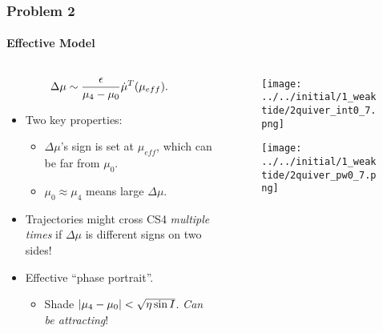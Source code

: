 \documentclass[dvipsnames, 11pt]{beamer}
\DeclarePairedDelimiter\abs{\lvert}{\rvert}
\DeclarePairedDelimiter\p{\lparen}{\rparen}
\begin{document}
\begin{frame}
    \frametitle{Problem 2}
    \framesubtitle{Effective Model}

    \begin{columns}
        \begin{column}{0.5\textwidth}
            \begin{equation*}
                \Delta \mu \sim \frac{\epsilon}{\mu_4 - \mu_0}
                        \dot{\mu}^{T}\p*{\mu_{eff}}.
            \end{equation*}
            \begin{itemize}
                \item Two key properties:
                    \begin{itemize}
                        \item $\Delta \mu$'s sign is set at $\mu_{eff}$, which
                            can be far from $\mu_0$.

                        \item $\mu_0 \approx \mu_4$ means large $\Delta \mu$.
                    \end{itemize}

                \item Trajectories might cross CS4 \emph{multiple times} if
                    $\Delta \mu$ is different signs on two sides!

                \item Effective ``phase portrait''.
                    \begin{itemize}
                        \item Shade $\abs*{\mu_4 - \mu_0} < \sqrt{\eta\sin I}$.
                            \emph{Can be attracting}!
                    \end{itemize}
            \end{itemize}
        \end{column}
        \begin{column}{0.5\textwidth}
            \begin{figure}[t]
                \centering
                \texttt{[image: ../../initial/1\_weaktide/2quiver\_int0\_7.png]}
            \end{figure}
            \begin{figure}[t]
                \centering
                \texttt{[image: ../../initial/1\_weaktide/2quiver\_pw0\_7.png]}
            \end{figure}
        \end{column}
    \end{columns}
\end{frame}
\end{document}

